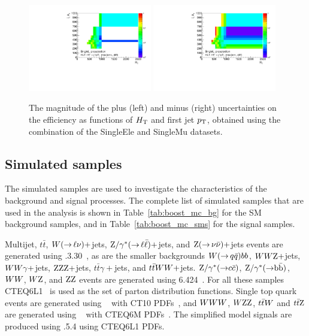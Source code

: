 \begin{figure}[htpb]
\centering
\includegraphics[width=0.48\textwidth]{figures/razor_trigger/h_HT_j1pt_0_pre_errdiff_up_ph_l_log}
\includegraphics[width=0.48\textwidth]{figures/razor_trigger/h_HT_j1pt_0_pre_errdiff_low_ph_l_log}
\caption{The magnitude of the plus (left) and minus (right) uncertainties on the efficiency as 
functions of $H_{\mathrm{T}} $ and first jet $p_{\mathrm{T}}$, obtained using the combination of the SingleEle and SingleMu 
datasets. 
\label{fig:boost_trigger_efficiency_unc}}
\end{figure}



\subsection{Simulated samples \label{sec:boost_mc_samples}}

The simulated samples are used to investigate the characteristics of the background and signal
processes.  The complete list of simulated samples that are used in the analysis is shown in 
Table~\ref{tab:boost_mc_bg} for the SM background samples, and in Table~\ref{tab:boost_mc_sms} for the 
signal samples. 

Multijet, $t\bar{t}$, $W({\rightarrow}\,\ell\nu)+$jets, $\mathrm{Z}/\gamma^*({\rightarrow}\,
\ell\bar{\ell})+$jets, and $\mathrm{Z}({\rightarrow}\, \nu \bar{\nu})+$jets events are generated using
.3.30~\cite{Alwall:2011uj}, as are the smaller backgrounds $W({\rightarrow}\, q
\bar{q})bb$, 
$WW\mathrm{Z}+$jets, $WW\gamma+$jets, $\mathrm{Z}\mathrm{Z}\mathrm{Z}+$jets, $t\bar{t}\gamma+$jets, and
$t\bar{t}WW+$jets.
$\mathrm{Z}/\gamma^*({\rightarrow} c\bar{c})$, $\mathrm{Z}/\gamma^*({\rightarrow} \mathrm{b}\bar{\mathrm{b}})$,
$WW$, $W\mathrm{Z}$, and $\mathrm{Z}\mathrm{Z}$ events are generated using 
{\PYTHIA}6.424~\cite{Sjostrand:2006za}.
For all these samples CTEQ6L1~\cite{Pumplin:2002vw} is used as the set of parton distribution
functions. 
Single top quark events are generated using ~\cite{powheg,powheg2} with CT10
PDFs~\cite{Lai:2010vv}, and $WWW$, $W\mathrm{Z}\mathrm{Z}$, $t\bar{t}W$ and $t\bar{t}\mathrm{Z}$ are generated using
\AMCATNLO~\cite{Frixione:2002ik} with CTEQ6M PDFs~\cite{Pumplin:2002vw}. 
The simplified model signals are produced using .5.4 using CTEQ6L1 PDFs.  

